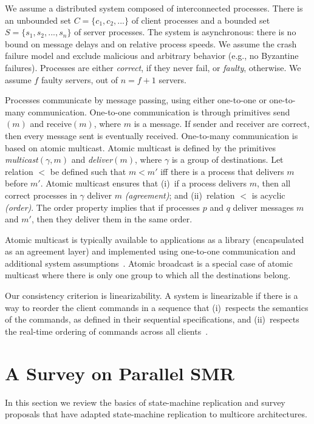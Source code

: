 \documentclass[conference]{IEEEtran}
\begin{document}
We assume a distributed system composed of interconnected processes. There is an unbounded set $C = \{ c_1, c_2, ... \}$ of client processes and a bounded set $S = \{ s_1, s_2, ..., s_n \}$ of server processes. The system is asynchronous: there is no bound on message delays and on relative process speeds. We assume the crash failure model and exclude malicious and arbitrary behavior (e.g., no Byzantine failures). Processes are either \emph{correct}, if they never fail, or \emph{faulty}, otherwise. We assume $f$ faulty servers, out of $n = f+1$ servers. 

Processes communicate by message passing, using either one-to-one or one-to-many communication. One-to-one communication is through primitives send$(m)$ and receive$(m)$, where $m$ is a message. If sender and receiver are correct, then every message sent is eventually received. 
One-to-many communication is based on atomic multicast. Atomic multicast is defined by the primitives \emph{multicast}$(\gamma, m)$ and \emph{deliver}$(m)$, where $\gamma$ is a group of destinations.
Let relation $<$ be defined such that $m < m'$ iff there is a process that delivers $m$ before $m'$.
Atomic multicast ensures that 
(i)~if a process delivers $m$, then all correct processes in $\gamma$ deliver $m$ \emph{(agreement)}; and
(ii)~relation $<$ is acyclic \emph{(order)}.
The order property implies that if processes $p$ and $q$ deliver messages $m$ and $m'$, then they deliver them in the same order.

Atomic multicast is typically available to applications as a library (encapsulated as an agreement layer) and implemented using one-to-one communication and additional system assumptions~\cite{CT96,Lam98}. Atomic broadcast is a special case of atomic multicast where there is only one group to which all the destinations belong. 

Our consistency criterion is linearizability.
A system is linearizable if there is a way to reorder the client commands in a sequence that (i)~respects the semantics of the commands, as defined in their sequential specifications, and (ii)~respects the real-time ordering of commands across all clients~\cite{Attiya04}. 


\section{A Survey on Parallel SMR}
\label{sec:survey}
In this section we review the basics of state-machine replication and survey proposals that have adapted state-machine replication to multicore architectures. 
\end{document}
